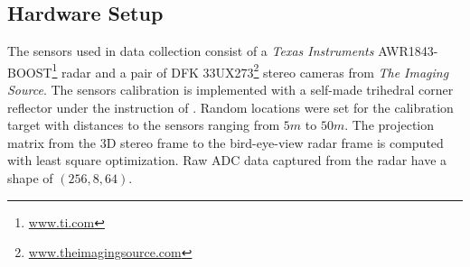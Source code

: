 \documentclass[10pt, conference, compsocconf]{IEEEtran}
\begin{document}
\subsection{Hardware Setup}
\label{Section:ProjectionMatrix}

{The sensors used in data collection consist of a \textit{Texas Instruments} AWR1843-BOOST\footnote{\url{www.ti.com}} radar and a pair of DFK 33UX273\footnote{\url{www.theimagingsource.com}} stereo cameras from \textit{The Imaging Source}. }
The sensors calibration 
is implemented with a self-made trihedral corner reflector 
under the instruction of \cite{BG:Calibration}. 
{Random locations were set for the calibration target with distances to the sensors ranging from $5 m$ to $50 m$. The projection matrix from the 3D stereo frame to the bird-eye-view radar frame is computed with least square optimization.} Raw ADC data captured from the radar have a shape of $(256, 8, 64)$.




\end{document}

